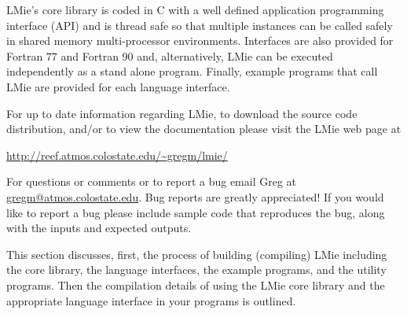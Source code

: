 LMie's core library is coded in C with a well defined application programming interface (API) and is thread safe so that multiple instances can be called safely in shared memory multi-processor environments.  Interfaces are also provided for Fortran 77 and Fortran 90 and, alternatively, LMie can be executed independently as a stand alone program.  Finally, example programs that call LMie are provided for each language interface.

For up to date information regarding LMie, to download the source code distribution, and/or to view the documentation please visit the LMie web page at
\begin{list}{}{}
\item \url{http://reef.atmos.colostate.edu/~gregm/lmie/}
\end{list}

For questions or comments or to report a bug email Greg at \href{mailto:gregm@atmos.colostate.edu}{gregm@atmos.colostate.edu}.  Bug reports are greatly appreciated!  If you would like to report a bug please include sample code that reproduces the bug, along with the inputs and expected outputs.


%
\label{introduction_to_lmie_license}



%
\label{introduction_to_lmie_conventions_used_in_this_manual}

\conventions


%
\label{building_and_using_lmie}

This section discusses, first, the process of building (compiling) LMie including the core library, the language interfaces, the example programs, and the utility programs.  Then the compilation details of using the LMie core library and the appropriate language interface in your programs is outlined.


\label{building_and_using_lmie_building_lmie}


